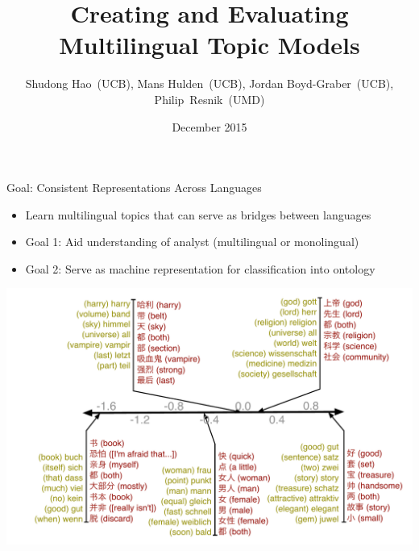 \documentclass[compress]{beamer}
\title[ITM]{Creating and Evaluating Multilingual Topic Models}
\author[Boyd-Graber]{Shudong Hao~(UCB), Mans Hulden~(UCB), Jordan Boyd-Graber~(UCB), Philip~Resnik~(UMD)}
\date{December 2015}
\institute[Boulder] %
{University of Maryland and University of Colorado Boulder}
\begin{document}
\maketitle


\begin{frame}{Goal: Consistent Representations Across Languages}
  \begin{itemize}
    \item Learn multilingual topics that can serve as
      bridges between languages
    \item Goal 1: Aid understanding of analyst (multilingual or
      monolingual)
    \item Goal 2: Serve as machine representation for classification
      into ontology
  \end{itemize}

  \begin{center}
    \includegraphics[width=.6\linewidth]{mlslda/chinese_amazon_dict}
  \end{center}

\end{frame}
\end{document}
